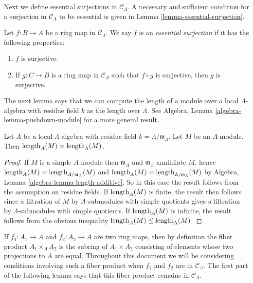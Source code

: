 \noindent
Next we define essential surjections in $\mathcal C_{\Lambda}$.  A necessary 
and sufficient condition for a surjection in $\mathcal C_{\Lambda}$ to be 
essential is given in Lemma \ref{lemma-essential-surjection}.

\begin{definition}
\label{definition-essential-surjection}
Let $f: B \rightarrow A$ be a ring map in $\mathcal C_{\Lambda}$.  We say $f$ 
is an {\it essential surjection} if it has the following properties:
\begin{enumerate}
\item $f$ is surjective.
\item If $g: C \rightarrow B$ is a ring map in $\mathcal C_{\Lambda}$ such that 
$f \circ g$ is surjective, then $g$ is surjective.
\end{enumerate}
\end{definition}

\noindent
The next lemma says that we can compute the length of a module over a local 
$\Lambda$-algebra with residue field $k$ as the length over $\Lambda$.  See 
Algebra, Lemma \ref{algebra-lemma-pushdown-module}
for a more general result.

\begin{lemma}
\label{lemma-length}
Let $A$ be a local $\Lambda$-algebra with residue field $k = 
\Lambda/\mathfrak{m}_{\Lambda}$.  Let $M$ be an $A$-module.  Then 
$\textnormal{length}_{A}(M) = \textnormal{length}_{\Lambda}(M)$.
\end{lemma}

\begin{proof}
If $M$ is a simple $A$-module then $\mathfrak{m}_{A}$ and 
$\mathfrak{m}_{\Lambda}$ annihilate $M$, hence $\textnormal{length}_{A}(M) = 
\textnormal{length}_{A/\mathfrak{m}_A}(M)$ and 
$\textnormal{length}_{\Lambda}(M) = 
\textnormal{length}_{\Lambda/\mathfrak{m}_{\Lambda}}(M)$ by
Algebra, Lemma \ref{algebra-lemma-length-additive}.
So in this case the result follows from the 
assumption on residue fields.  If $\textnormal{length}_{A}(M)$ is finite, the 
result then follows since a filtration of $M$ by $A$-submodules with simple 
quotients gives a filtration by $\Lambda$-submodules with simple quotients. If 
$\textnormal{length}_{A}(M)$ is infinite, the result follows from the obvious 
inequality $\textnormal{length}_{A}(M) \leq \textnormal{length}_{\Lambda}(M)$.
\end{proof}

\noindent
If $f_1: A_1 \rightarrow A$ and $f_2: A_2 \rightarrow A$ are two ring maps, 
then by definition the fiber product $A_1 \times_{A} A_2$ is the subring of 
$A_1 \times A_2$ consisting of elements whose two projections to $A$ are equal. 
Throughout this document we will be considering conditions involving such a 
fiber product when $f_1$ and $f_2$ are in $\mathcal C_{\Lambda}$.  The first 
part of the following lemma says that this fiber product remains in $\mathcal 
C_{\Lambda}$.


